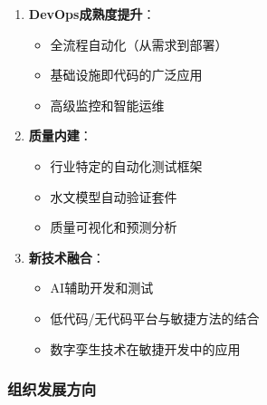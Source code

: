 \begin{enumerate}
\def\labelenumi{\arabic{enumi}.}
\tightlist
\item
  \textbf{DevOps成熟度提升}：

  \begin{itemize}
  \tightlist
  \item
    全流程自动化（从需求到部署）
  \item
    基础设施即代码的广泛应用
  \item
    高级监控和智能运维
  \end{itemize}
\item
  \textbf{质量内建}：

  \begin{itemize}
  \tightlist
  \item
    行业特定的自动化测试框架
  \item
    水文模型自动验证套件
  \item
    质量可视化和预测分析
  \end{itemize}
\item
  \textbf{新技术融合}：

  \begin{itemize}
  \tightlist
  \item
    AI辅助开发和测试
  \item
    低代码/无代码平台与敏捷方法的结合
  \item
    数字孪生技术在敏捷开发中的应用
  \end{itemize}
\end{enumerate}

\subsubsection{组织发展方向}\label{ux7ec4ux7ec7ux53d1ux5c55ux65b9ux5411}

